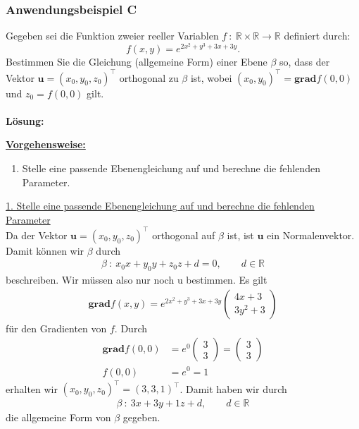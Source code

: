 \subsubsection*{Anwendungsbeispiel C}
Gegeben sei die Funktion zweier reeller Variablen 
$f \ : \ \mathbb{R}\times \mathbb{R} \to \mathbb{R}$ definiert durch:
\begin{equation*}
f(x,y) = e^{2x^2+y^3 +3x +3y}.
\end{equation*}
Bestimmen Sie die Gleichung (allgemeine Form) einer Ebene $\beta$ so,
dass der Vektor $\textbf{u} = (x_0,y_0,z_0)^\top$ orthogonal zu $\beta$ ist,
wobei $(x_0,y_0)^\top = \textbf{grad} f(0,0)$ und $z_0 = f(0,0)$ gilt.
\\
\\
\textbf{Lösung:}
\begin{mdframed}
\underline{\textbf{Vorgehensweise:}}
\renewcommand{\labelenumi}{\theenumi.}
\begin{enumerate}
\item Stelle eine passende Ebenengleichung auf und berechne die fehlenden Parameter.
\end{enumerate}
\end{mdframed}

\underline{1. Stelle eine passende Ebenengleichung auf und berechne die fehlenden Parameter}\\
Da der Vektor $\textbf{u} = (x_0,y_0,z_0)^\top$ orthogonal auf $\beta$ ist, ist $\textbf{u}$ ein Normalenvektor.
Damit können wir $\beta$ durch
\begin{align*}
\beta \ : \ x_0 x + y_0 y + z_0 z + d  = 0, \qquad d \in \mathbb{R}
\end{align*}
beschreiben.
Wir müssen also nur noch $\text{u}$ bestimmen.
Es gilt  
\begin{align*}
\textbf{grad} f(x,y) = e^{2x^2+y^3 +3x +3y} 
\begin{pmatrix}
4 x+ 3\\
3 y^2 + 3 
\end{pmatrix}
\end{align*}
für den Gradienten von $f$.
Durch
\begin{align*}
\textbf{grad} f(0 ,0)&=
e^0
\begin{pmatrix}
3\\
3
\end{pmatrix}
=
\begin{pmatrix}
3\\
3
\end{pmatrix} \\
f(0,0) &= e^0 = 1
\end{align*}
erhalten wir $(x_0,y_0,z_0)^\top = ( 3, 3,1)^\top$.
Damit haben wir durch
\begin{align*}
\beta \ : \ 3 x + 3 y + 1 z + d, \qquad d \in \mathbb{R}
\end{align*}
die allgemeine Form von $\beta$ gegeben.



